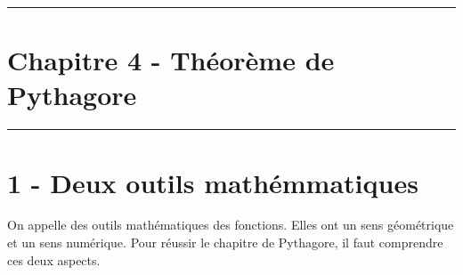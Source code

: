\documentclass[12pt]{article}
\newcommand{\horrule}[1]{\rule{\linewidth}{#1}} %
\begin{document}

\newtheorem{Definition}{Définition}
\newtheorem{Theorem}{Théorème}
\newtheorem{Proposition}{Propriété}

\renewcommand{\labelitemi}{$\bullet$}
\renewcommand{\labelitemii}{$\circ$}

\setlength{\columnseprule}{1pt}

\horrule{2px}
\section*{Chapitre 4 - Théorème de Pythagore}
\horrule{2px}

\section*{1 - Deux outils mathémmatiques}

On appelle des outils mathématiques des fonctions. Elles ont un sens géométrique et un sens numérique. Pour réussir le chapitre de Pythagore, il faut comprendre ces deux aspects. 
\end{document}

